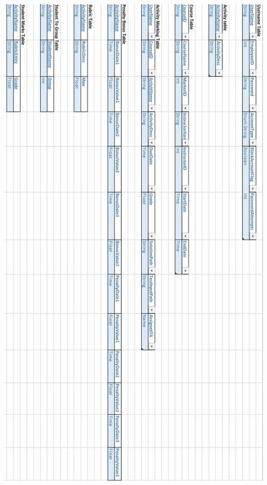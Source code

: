 \documentclass{article}
\begin{document}
\centerline{\includegraphics[scale=0.7]{../images/Data_Persistance.png}}
\end{document}
